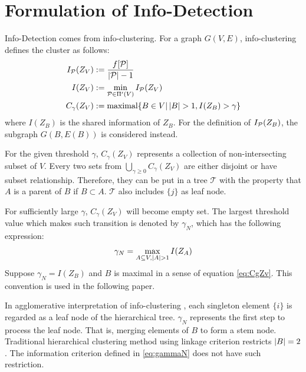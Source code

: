 \documentclass[runningheads]{llncs}
\begin{document}
\section{Formulation of Info-Detection}\label{sec:ID}
Info-Detection comes from info-clustering. For a graph $G(V,E)$, info-clustering defines the cluster as follows:
\begin{align}
I_{\P}(Z_V) & := \frac{ f[\P] }{  \abs{\mathcal{P}} - 1 }\\
I(Z_V) & := \min_{\mathcal{P} \in \Pi'(V)} I_{\mathcal{P}}(Z_V)  \label{eq:ms} \\
C_{\gamma}(Z_V) & := \textrm{maximal}\{ B \in V \vert \, \abs{B} > 1, I(Z_B) > \gamma \} \label{eq:CgZv}
\end{align}
where $I(Z_B)$ is the shared information of $Z_B$. For the definition of $I_{\P}(Z_B)$, the subgraph $G(B,E(B))$ is considered instead.

For the given threshold $\gamma$, $C_{\gamma} (Z_V)$ represents a collection of non-intersecting subset of $V$. Every two sets from $\bigcup_{\gamma \geq 0} C_{\gamma}(Z_V)$ are either disjoint or have subset relationship. Therefore, they can be put in a tree $\mathcal{T}$ with the property that $A$ is a parent of $B$ if $B\subset A$. $\mathcal{T}$ also includes $\{j\}$ as leaf node. 

For sufficiently large $\gamma$, $C_{\gamma} (Z_V)$ will become empty set. The largest threshold value which makes such transition is denoted by $\gamma_N$, which has the following expression:
\begin{equation}\label{eq:gammaN}
\gamma_N = \max_{A\subseteq V, \abs{A}>1} I(Z_A)
\end{equation}
Suppose $\gamma_N=I(Z_B)$ and $B$ is maximal in a sense of equation \eqref{eq:CgZv}. This convention is used in the following paper.

In agglomerative interpretation of info-clustering \cite{RN8}, each singleton element $\{i\}$ is regarded as a leaf node of the hierarchical tree. $\gamma_N$ represents the first step to process the leaf node. That is, merging elements of $B$ to form a stem node. Traditional hierarchical clustering method using linkage criterion restricts $\abs{B}=2$. The information criterion defined in \eqref{eq:gammaN} does not have such restriction. 
\end{document}
